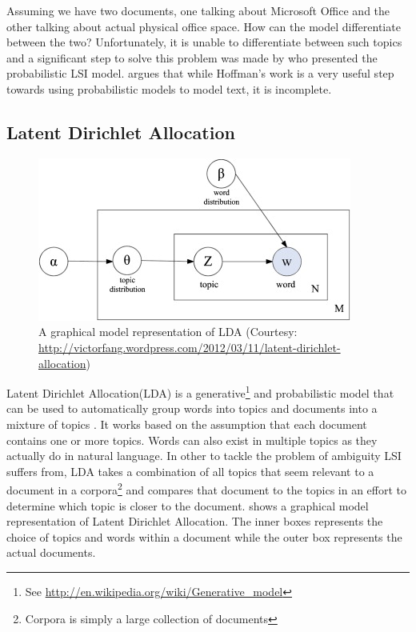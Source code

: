 Assuming we have two documents, one talking about Microsoft Office and the other talking about
actual physical office space. How can the model differentiate between the two? Unfortunately, it is
unable to differentiate between such topics and a significant step to solve this problem was made by
\citet{hofmann1999probabilistic} who presented the probabilistic LSI model. \citet{blei2003latent}
argues that while Hoffman's work is a very useful step towards using probabilistic models to model
text, it is incomplete.

\subsection{Latent Dirichlet Allocation}
\label{sec:bg-lda}

\begin{figure}[H]
\begin{center}
    \includegraphics[scale=1.5]{Figures/lda}
\end{center}
\caption{A graphical model representation of LDA (Courtesy: \url{http://victorfang.wordpress.com/2012/03/11/latent-dirichlet-allocation})}
\label{fig:lda}
\end{figure}

Latent Dirichlet Allocation(LDA) is a generative\footnote{See
\url{http://en.wikipedia.org/wiki/Generative_model}} and probabilistic model that can be used to
automatically group words into topics and documents into a mixture of topics \citep{blei2003latent}.
It works based on the assumption that each document contains one or more topics. Words can also
exist in multiple topics as they actually do in natural language. In other to tackle the problem of
ambiguity LSI suffers from, LDA takes a combination of all topics that seem relevant
to a document in a corpora\footnote{Corpora is simply a large collection of documents} and compares
that document to the topics in an effort to determine which topic is closer to the document.
 shows a graphical model representation of Latent Dirichlet Allocation. The inner
boxes represents the choice of topics and words within a document while the outer box represents the
actual documents.

